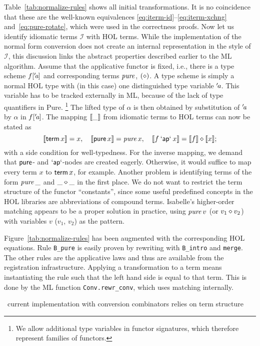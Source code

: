 Table~\ref{tab:normalize-rules} shows all initial transformations.
It is no coincidence that these are the well-known equivalences
\eqref{eq:iterm-id}--\eqref{eq:iterm-xchng} and~\eqref{eq:pure-rotate}, which
were used in the correctness proofs.
Now let us identify idiomatic terms $\mathcal{I}$ with HOL terms.
While the implementation of the normal form conversion does not create an
internal representation in the style of $\mathcal{I}$, this discussion links
the abstract properties described earlier to the ML algorithm.
Assume that the applicative functor is fixed, i.e., there is a type scheme
$f['\!\textit{a}]$ and corresponding terms $\operatorname{\mathit{pure}}$, $(\diamond)$.
A type scheme is simply a normal HOL type with (in this case) one distinguished
type variable $'\!\textit{a}$.
This variable has to be tracked externally in ML, because of the lack of
type quantifiers in Pure.%
\footnote{We allow additional type variables in functor signatures, which
therefore represent families of functors.}  %
The lifted type of $\alpha$ is then obtained by substitution of $'\!\textit{a}$ by
$\alpha$ in $f['\!\textit{a}]$.
The mapping $\llbracket\_\rrbracket$ from idiomatic terms to HOL terms can now be stated as
\[ \llbracket\operatorname{\mathsf{term}} x\rrbracket = x, \quad \llbracket\operatorname{\mathsf{pure}} x\rrbracket = \operatorname{\mathit{pure}} x, \quad
	\llbracket f \mathbin{\mathsf{`ap`}} x \rrbracket = \llbracket f\rrbracket \diamond \llbracket x\rrbracket; \]
with a side condition for well-typedness.
For the inverse mapping, we demand that $\operatorname{\mathsf{pure}}$- and $\mathbin{\mathsf{`ap`}}$-nodes are created
eagerly.
Otherwise, it would suffice to map every term $x$ to $\operatorname{\mathsf{term}} x$, for example.
Another problem is identifying terms of the form $\operatorname{\mathit{pure}} \_$ and $\_ \diamond \_$ in
the first place.
We do not want to restrict the term structure of the functor ``constants'',
since some useful predefined concepts in the HOL libraries are abbreviations of
compound terms.
Isabelle's higher-order matching appears to be a proper solution in practice,
using $\operatorname{\mathit{pure}} v$ (or $v_1 \diamond v_2$) with variables $v$ ($v_1$, $v_2$) as the
pattern.

Figure~\ref{tab:normalize-rules} has been augmented with the corresponding HOL
equations.
Rule \texttt{B\_pure} is easily proven by rewriting with \texttt{B\_intro} and
\texttt{merge}.
The other rules are the applicative laws and thus are available from the
registration infrastructure.
Applying a transformation to a term means instantiating the rule such that the
left hand side is equal to that term.
This is done by the ML function \verb+Conv.rewr_conv+, which uses matching
internally.

\todo\ current implementation with conversion combinators relies on term structure
